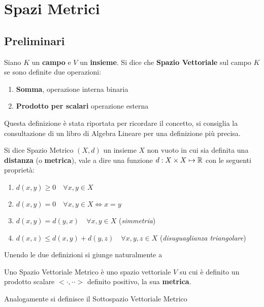 \chapter{Spazi Metrici}

\section{Preliminari}

\begin{definition}
	Siano $K$ un \textbf{campo} e $V$ un \textbf{insieme}. Si dice che \textbf{Spazio Vettoriale} sul campo $K$ se sono definite due operazioni:
	\begin{enumerate}
		\item \textbf{Somma}, operazione interna binaria
		\item \textbf{Prodotto per scalari} operazione esterna
	\end{enumerate}
	\begin{note}
		Questa definizione è stata riportata per ricordare il concetto, si consiglia la consultazione di un libro di Algebra Lineare per una definizione più precisa.
	\end{note}
\end{definition}

\begin{definition}
	\label{def:sp_metrico}
	Si dice Spazio Metrico $(X,d)$ un insieme $X$ non vuoto in cui sia definita una \textbf{distanza} (o \textbf{metrica}), vale a dire una funzione $d: X \times X \mapsto \mathbb{R}$ con le seguenti proprietà:
	\begin{enumerate}
		\item $d(x,y) \geq 0 \quad \forall x,y \in X$
		\item $d(x,y) = 0 \quad \forall x,y \in X \iff x=y$
		\item $d(x,y) = d(y,x) \quad \forall x,y \in X$ \quad(\textit{simmetria})
		\item $d(x,z) \leq d(x,y)+d(y,z) \quad \forall x,y,z\in X$ \quad(\textit{disuguaglianza triangolare})
	\end{enumerate}
\end{definition}

Unendo le due definizioni si giunge naturalmente a
\begin{definition}
	Uno Spazio Vettoriale Metrico è uno spazio vettoriale $V$ su cui è definito un prodotto scalare $<\cdot,\cdot·>$ definito positivo, la sua \textbf{metrica}.
	\begin{note}
		Analogamente si definisce il Sottospazio Vettoriale Metrico
	\end{note}
\end{definition}

